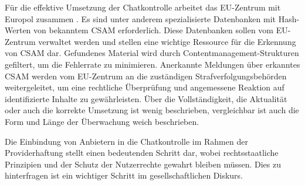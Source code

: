 \documentclass[a4paper]{article}
\begin{document}
Für die effektive Umsetzung der Chatkontrolle arbeitet das EU-Zentrum mit Europol zusammen \cite{euc_europol}. Es sind unter anderem spezialisierte Datenbanken mit Hash-Werten von bekanntem CSAM erforderlich. Diese Datenbanken sollen vom EU-Zentrum verwaltet werden und stellen eine wichtige Ressource für die Erkennung von CSAM dar. Gefundenes Material wird durch Contentmanagement-Strukturen gefiltert, um die Fehlerrate zu minimieren.
Anerkannte Meldungen über erkanntes CSAM werden vom EU-Zentrum an die zuständigen Strafverfolgungsbehörden weitergeleitet, um eine rechtliche Überprüfung und angemessene Reaktion auf identifizierte Inhalte zu gewährleisten. Über die Vollständigkeit, die Aktualität oder auch die korrekte Umsetzung ist wenig beschrieben, vergleichbar ist auch die Form und Länge der Überwachung weich beschrieben. 

Die Einbindung von Anbietern in die Chatkontrolle im Rahmen der Providerhaftung stellt einen bedeutenden Schritt dar, wobei rechtsstaatliche Prinzipien und der Schutz der Nutzerrechte gewahrt bleiben müssen. Dies zu hinterfragen ist ein wichtiger Schritt im gesellschaftlichen Diskurs. 
\end{document}
